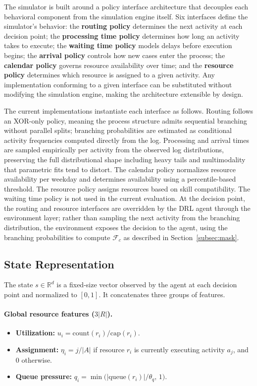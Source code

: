 \documentclass[runningheads]{llncs}
\begin{document}
The simulator is built around a policy interface architecture that decouples each behavioral component from the simulation engine itself. Six interfaces define the simulator's behavior: the \textbf{routing policy} determines the next activity at each decision point; the \textbf{processing time policy} determines how long an activity takes to execute; the \textbf{waiting time policy} models delays before execution begins; the \textbf{arrival policy} controls how new cases enter the process; the \textbf{calendar policy} governs resource availability over time; and the \textbf{resource policy} determines which resource is assigned to a given activity. Any implementation conforming to a given interface can be substituted without modifying the simulation engine, making the architecture extensible by design.

The current implementations instantiate each interface as follows. Routing follows an XOR-only policy, meaning the process structure admits sequential branching without parallel splits; branching probabilities are estimated as conditional activity frequencies computed directly from the log. Processing and arrival times are sampled empirically per activity from the observed log distributions, preserving the full distributional shape including heavy tails and multimodality that parametric fits tend to distort. The calendar policy normalizes resource availability per weekday and determines availability using a percentile-based threshold. The resource policy assigns resources based on skill compatibility. The waiting time policy is not used in the current evaluation. At the decision point, the routing and resource interfaces are overridden by the DRL agent through the environment layer; rather than sampling the next activity from the branching distribution, the environment exposes the decision to the agent, using the branching probabilities to compute $\mathcal{F}_c$ as described in Section~\ref{subsec:mask}.

\subsection{State Representation}
\label{subsec:state_representation}

The state $s\in\mathbb{R}^{d}$ is a fixed-size vector observed by the agent at
each decision point and normalized to $[0,1]$. It concatenates three groups of
features.
\\

\paragraph{Global resource features ($3|R|$).}
\begin{itemize}[label=$\bullet$, itemsep=0pt, topsep=1pt]
  \item \textbf{Utilization:} $u_i = \mathrm{count}(r_i) / \mathrm{cap}(r_i)$.
  \item \textbf{Assignment:} $\eta_i = j/|A|$ if resource $r_i$ is currently executing activity $a_j$, and $0$ otherwise.
  \item \textbf{Queue pressure:} $q_i = \min\!\bigl(|\mathrm{queue}(r_i)|/\theta_q,\, 1\bigr)$.
\end{itemize}
\end{document}
